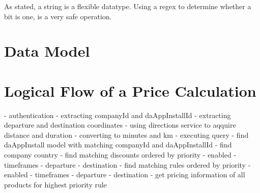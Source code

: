 As stated, a string is a flexible datatype. Using a regex to determine whether a bit is one, is a very safe operation.

%
\section{Data Model}


%
\section{Logical Flow of a Price Calculation}

- authentication
- extracting companyId and daAppInstallId
- extracting departure and destination coordinates
- using directions service to aqquire distance and duration
	- converting to minutes and km
- executing query
	- find daAppInstall model with matching companyId and daAppInstallId
	- find company country
	- find matching discounts ordered by priority
	  - enabled
		- timeframes
		- departure
		- destination
	- find matching rules ordered by priority
	  - enabled
		- timeframes
		- departure
		- destination
	- get pricing information of all products for highest priority rule














